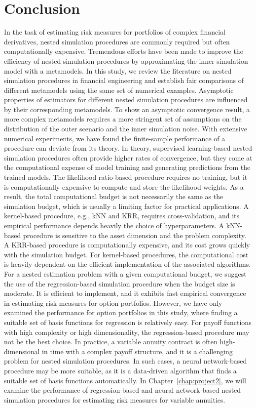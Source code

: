 \section{Conclusion} \label{sec1:conclusion}
In the task of estimating risk measures for portfolios of complex financial derivatives, nested simulation procedures are commonly required but often computationally expensive. 
Tremendous efforts have been made to improve the efficiency of nested simulation procedures by approximating the inner simulation model with a metamodels. 
In this study, we review the literature on nested simulation procedures in financial engineering and establish fair comparisons of different metamodels using the same set of numerical examples. 
Asymptotic properties of estimators for different nested simulation procedures are influenced by their corresponding metamodels.
To show an asymptotic convergence result, a more complex metamodels requires a more stringent set of assumptions on the distribution of the outer scenario and the inner simulation noise.
With extensive numerical experiments, we have found the finite-sample performance of a procedure can deviate from its theory. 
In theory, supervised learning-based nested simulation procedures often provide higher rates of convergence, but they come at the computational expense of model training and generating predictions from the trained models. 
The likelihood ratio-based procedure requires no training, but it is computationally expensive to compute and store the likelihood weights.
As a result, the total computational budget is not necessarily the same as the simulation budget, which is usually a limiting factor for practical applications.
A kernel-based procedure, e.g., kNN and KRR, requires cross-validation, and its empirical performance depends heavily the choice of hyperparameters.
A kNN-based procedure is sensitive to the asset dimension and the problem complexity.
A KRR-based procedure is computationally expensive, and its cost grows quickly with the simulation budget.
For kernel-based procedures, the computational cost is heavily dependent on the efficient implementation of the associated algorithms.
For a nested estimation problem with a given computational budget, we suggest the use of the regression-based simulation procedure when the budget size is moderate. 
It is efficient to implement, and it exhibits fast empirical convergence in estimating risk measures for option portfolios. 
However, we have only examined the performance for option portfolios in this study, where finding a suitable set of basis functions for regression is relatively easy.
For payoff functions with high complexity or high dimensionality, the regression-based procedure may not be the best choice.
In practice, a variable annuity contract is often high-dimensional in time with a complex payoff structure, and it is a challenging problem for nested simulation procedures.
In such cases, a neural network-based procedure may be more suitable, as it is a data-driven algorithm that finds a suitable set of basis functions automatically.
In Chapter~\ref{chap:project2}, we will examine the performance of regression-based and neural network-based nested simulation procedures for estimating risk measures for variable annuities.
